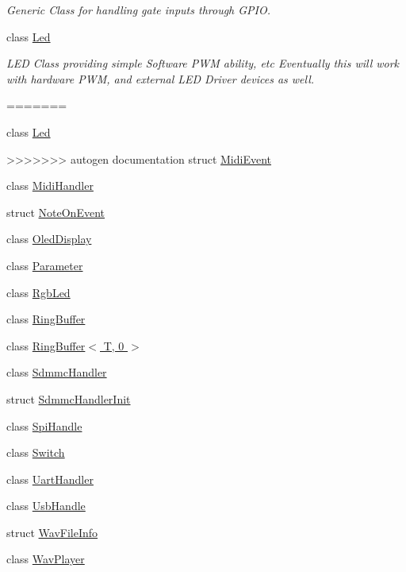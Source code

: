 \begin{DoxyCompactItemize}
\begin{DoxyCompactList}\small\item\em Generic Class for handling gate inputs through G\+P\+IO. \end{DoxyCompactList}\item 
class \hyperlink{classdaisy_1_1_led}{Led}
\begin{DoxyCompactList}\small\item\em L\+ED Class providing simple Software P\+WM ability, etc Eventually this will work with hardware P\+WM, and external L\+ED Driver devices as well. \end{DoxyCompactList}\item 
=======
\item 
class \hyperlink{classdaisy_1_1_led}{Led}
\item 
>>>>>>> autogen documentation
struct \hyperlink{structdaisy_1_1_midi_event}{Midi\+Event}
\item 
class \hyperlink{classdaisy_1_1_midi_handler}{Midi\+Handler}
\item 
struct \hyperlink{structdaisy_1_1_note_on_event}{Note\+On\+Event}
\item 
class \hyperlink{classdaisy_1_1_oled_display}{Oled\+Display}
\item 
class \hyperlink{classdaisy_1_1_parameter}{Parameter}
\item 
class \hyperlink{classdaisy_1_1_rgb_led}{Rgb\+Led}
\item 
class \hyperlink{classdaisy_1_1_ring_buffer}{Ring\+Buffer}
\item 
class \hyperlink{classdaisy_1_1_ring_buffer_3_01_t_00_010_01_4}{Ring\+Buffer$<$ T, 0 $>$}
\item 
class \hyperlink{classdaisy_1_1_sdmmc_handler}{Sdmmc\+Handler}
\item 
struct \hyperlink{structdaisy_1_1_sdmmc_handler_init}{Sdmmc\+Handler\+Init}
\item 
class \hyperlink{classdaisy_1_1_spi_handle}{Spi\+Handle}
\item 
class \hyperlink{classdaisy_1_1_switch}{Switch}
\item 
class \hyperlink{classdaisy_1_1_uart_handler}{Uart\+Handler}
\item 
class \hyperlink{classdaisy_1_1_usb_handle}{Usb\+Handle}
\item 
struct \hyperlink{structdaisy_1_1_wav_file_info}{Wav\+File\+Info}
\item 
class \hyperlink{classdaisy_1_1_wav_player}{Wav\+Player}
\end{DoxyCompactItemize}
